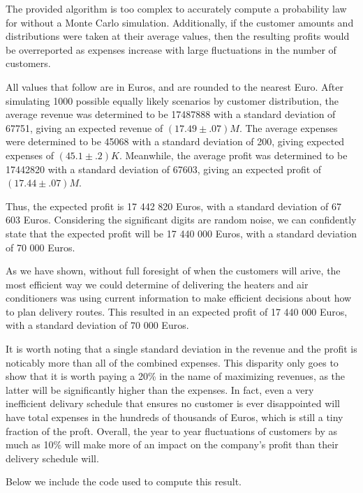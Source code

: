 \begin{paper}

The provided algorithm is too complex to accurately compute a probability law for without a Monte Carlo simulation.
Additionally, if the customer amounts and distributions were taken at their average values, then the resulting profits would be overreported as expenses increase with large fluctuations in the number of customers.

All values that follow are in Euros, and are rounded to the nearest Euro.
After simulating 1000 possible equally likely scenarios by customer distribution, the average revenue was determined to be \SI{17487888}{} with a standard deviation of \SI{67751}{}, giving an expected revenue of $(17.49\pm.07)M$.
The average expenses were determined to be \SI{45068}{} with a standard deviation of \SI{200}{}, giving expected expenses of $(45.1\pm.2)K$.
Meanwhile, the average profit was determined to be \SI{17442820}{} with a standard deviation of \SI{67603}{}, giving an expected profit of $(17.44\pm.07)M$.

Thus, the expected profit is 17 442 820 Euros, with a standard deviation of 67 603 Euros.
Considering the significant digits are random noise, we can confidently state that the expected profit will be 17 440 000 Euros, with a standard deviation of 70 000 Euros.


As we have shown, without full foresight of when the customers will arive, the most efficient way we could determine of delivering the heaters and air conditioners was using current information to make efficient decisions about how to plan delivery routes.
This resulted in an expected profit of 17 440 000 Euros, with a standard deviation of 70 000 Euros.

It is worth noting that a single standard deviation in the revenue and the profit is noticably more than all of the combined expenses.
This disparity only goes to show that it is worth paying a 20\% in the name of maximizing revenues, as the latter will be significantly higher than the expenses.
In fact, even a very inefficient delivary schedule that ensures no customer is ever disappointed will have total expenses in the hundreds of thousands of Euros, which is still a tiny fraction of the proft.
Overall, the year to year fluctuations of customers by as much as 10\% will make more of an impact on the company's profit than their delivery schedule will.


Below we include the code used to compute this result.
\end{paper}




